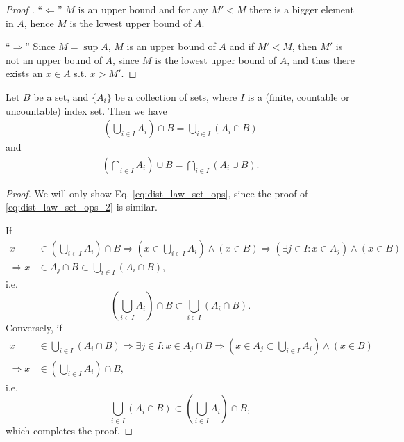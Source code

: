\begin{proof}[Proof \cite{src:supremum_and_infimum}]
	\enquote{$\Longleftarrow$} $M$ is an upper bound and for any $M' < M$ there is a bigger element in $A$, hence $M$ is the lowest upper bound of $A$.
	
	\enquote{$\Longrightarrow$} Since $M = \sup A$, $M$ is an upper bound of $A$ and if $M' < M$, then $M'$ is not an upper bound of $A$, since $M$ is the lowest upper bound of $A$, and thus there exists an $x\in A$ s.t. $x > M'$.
\end{proof}

\begin{theorem}
	Let $B$ be a set, and $\{A_i\}$ be a collection of sets, where $I$ is a (finite, countable or uncountable) index set. Then we have
	\begin{align}\label{eq:dist_law_set_ops}
		\left(\bigcup_{i\in I} A_i\right) \cap B = \bigcup_{i\in I}(A_i \cap B)
	\end{align}
	and 
	\begin{align}\label{eq:dist_law_set_ops_2}
		\left(\bigcap_{i\in I}A_i\right) \cup B = \bigcap_{i\in I}(A_i \cup B).
	\end{align}
\end{theorem}

\begin{proof}
	We will only show Eq. \eqref{eq:dist_law_set_ops}, since the proof of \eqref{eq:dist_law_set_ops_2} is similar.
	
	If 
	\begin{align*}
		x&\in \left(\bigcup_{i\in I} A_i\right) \cap B \Rightarrow \left(x\in \bigcup_{i\in I}A_i\right) \wedge \left(x\in B\right)\Rightarrow (\exists j\in I: x\in A_j) \wedge (x\in B)
		\\ \Rightarrow x&\in A_j\cap B \subset \bigcup_{i\in I}(A_i \cap B),
	\end{align*}
	i.e. $$\left(\bigcup_{i\in I} A_i\right) \cap B \subset \bigcup_{i\in I}(A_i \cap B).$$
	Conversely, if 
	\begin{align*}
		x&\in \bigcup_{i\in I}(A_i \cap B) \Rightarrow \exists j\in I: x\in A_j \cap B\Rightarrow \left(x\in A_j\subset \bigcup_{i\in I}A_i\right) \wedge \left(x\in B\right)
		\\ \Rightarrow x &\in \left(\bigcup_{i\in I}A_i\right) \cap B,
	\end{align*}
	i.e. 
	$$\bigcup_{i\in I}(A_i \cap B) \subset \left(\bigcup_{i\in I} A_i\right) \cap B,$$
	which completes the proof.
\end{proof}

